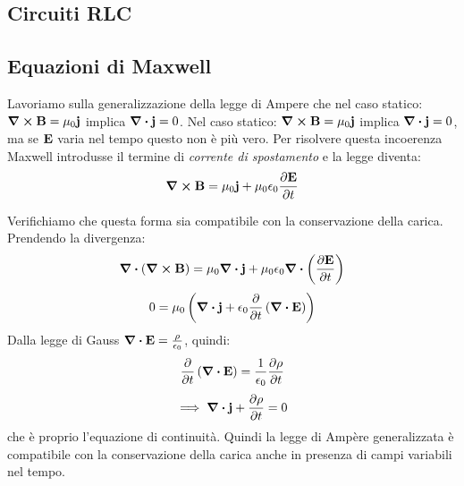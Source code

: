 \documentclass[12pt,a4paper]{article}
\begin{document}
\subsection{Circuiti RLC}
\subsection{Equazioni di Maxwell}
Lavoriamo sulla generalizzazione della legge di Ampere che nel caso statico: $\curl{\vb{B}}= \mu_0\vb{j}$ implica $\div{\vb{j}}=0$.
Nel caso statico: $\curl{\vb{B}}= \mu_0\vb{j}$ implica $\div{\vb{j}}=0$, ma se $\vb{E}$ varia nel tempo questo non è più vero. Per risolvere questa incoerenza Maxwell introdusse il termine di \textit{corrente di spostamento} e la legge diventa:
\begin{equation*}
    \curl{\vb{B}} = \mu_0 \vb{j} + \mu_0 \epsilon_0 \pdv{\vb{E}}{t}
\end{equation*}

Verifichiamo che questa forma sia compatibile con la conservazione della carica. Prendendo la divergenza:
\begin{equation*}
    \div(\curl{\vb{B}}) = \mu_0 \div{\vb{j}} + \mu_0 \epsilon_0 \div\left( \pdv{\vb{E}}{t} \right)
\end{equation*}
\begin{equation*}
    0 = \mu_0 \left( \div{\vb{j}} + \epsilon_0 \pdv{ }{t} \left(\div{\vb{E}}\right) \right)
\end{equation*}
Dalla legge di Gauss $\div{\vb{E}} = \frac{\rho}{\epsilon_0}$, quindi:
\begin{equation*}
    \pdv{ }{t} \left(\div{\vb{E}}\right) = \frac{1}{\epsilon_0}\pdv{\rho}{t}
\end{equation*}
\begin{equation*}
    \implies \div{\vb{j}} + \pdv{\rho}{t} = 0
\end{equation*}
che è proprio l'equazione di continuità. Quindi la legge di Ampère generalizzata è compatibile con la conservazione della carica anche in presenza di campi variabili nel tempo.
\end{document}
